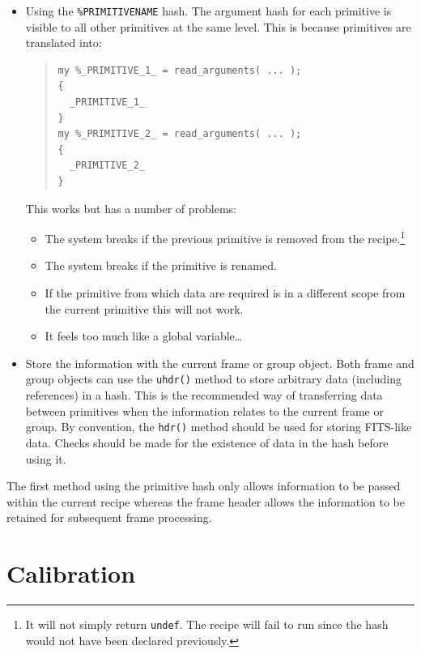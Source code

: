 \documentclass[twoside,11pt]{article}
\renewcommand{\_}{\texttt{\symbol{95}}}
\newenvironment{myquote}{\begin{quote}\begin{small}}{\end{small}\end{quote}}
\begin{document}
\begin{itemize}
\item Using the \texttt{\%\_PRIMITIVE\_NAME\_} hash. The argument hash 
for each primitive is visible to all other primitives at the same
level.  This is because primitives are translated into:
\begin{myquote}
\begin{verbatim}
my %_PRIMITIVE_1_ = read_arguments( ... );
{
  _PRIMITIVE_1_
}
my %_PRIMITIVE_2_ = read_arguments( ... );
{
  _PRIMITIVE_2_
}
\end{verbatim}
\end{myquote}
This works but has a number of problems:
\begin{itemize}
\item The system breaks if the previous primitive is removed from the
recipe.\footnote{It will not simply return \texttt{undef}. The recipe
will fail to run since the hash would not have been declared previously.}
\item The system breaks if the primitive is renamed.
\item If the primitive from which data are required is in a different
scope from the current primitive this will not work.
\item It feels too much like a global variable\ldots
\end{itemize}

\item Store the information with the current frame or group object.
Both frame and group objects can use the \texttt{uhdr()} method to
store arbitrary data (including references) in a hash. This is the
recommended way of transferring data between primitives when the
information relates to the current frame or group. By convention, the
\texttt{hdr()} method should be used for storing FITS-like data.
Checks should be made for the existence of data in the hash before
using it.
\end{itemize}
The first method using the primitive hash only allows information to
be passed within the current recipe whereas the frame header allows
the information to be retained for subsequent frame processing.

\section{Calibration}
\end{document}
